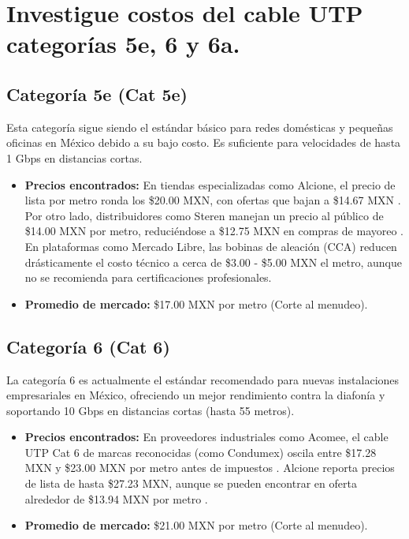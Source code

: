 \documentclass[a4paper,12pt]{article}
\begin{document}
\newpage
\section{ Investigue costos del cable UTP categorías 5e, 6 y 6a.}

\subsection*{Categoría 5e (Cat 5e)}
Esta categoría sigue siendo el estándar básico para redes domésticas y pequeñas oficinas en México debido a su bajo costo. Es suficiente para velocidades de hasta 1 Gbps en distancias cortas.

\begin{itemize}
    \item \textbf{Precios encontrados:} En tiendas especializadas como Alcione, el precio de lista por metro ronda los \$20.00 MXN, con ofertas que bajan a \$14.67 MXN \cite{alcione2026}. Por otro lado, distribuidores como Steren manejan un precio al público de \$14.00 MXN por metro, reduciéndose a \$12.75 MXN en compras de mayoreo \cite{steren2026}. En plataformas como Mercado Libre, las bobinas de aleación (CCA) reducen drásticamente el costo técnico a cerca de \$3.00 - \$5.00 MXN el metro, aunque no se recomienda para certificaciones profesionales.
    \item \textbf{Promedio de mercado:} \$17.00 MXN por metro (Corte al menudeo).
\end{itemize}

\subsection*{Categoría 6 (Cat 6)}
La categoría 6 es actualmente el estándar recomendado para nuevas instalaciones empresariales en México, ofreciendo un mejor rendimiento contra la diafonía y soportando 10 Gbps en distancias cortas (hasta 55 metros).

\begin{itemize}
    \item \textbf{Precios encontrados:} En proveedores industriales como Acomee, el cable UTP Cat 6 de marcas reconocidas (como Condumex) oscila entre \$17.28 MXN y \$23.00 MXN por metro antes de impuestos \cite{acomee2026}. Alcione reporta precios de lista de hasta \$27.23 MXN, aunque se pueden encontrar en oferta alrededor de \$13.94 MXN por metro \cite{alcione2026}.
    \item \textbf{Promedio de mercado:} \$21.00 MXN por metro (Corte al menudeo).
\end{itemize}
\end{document}

